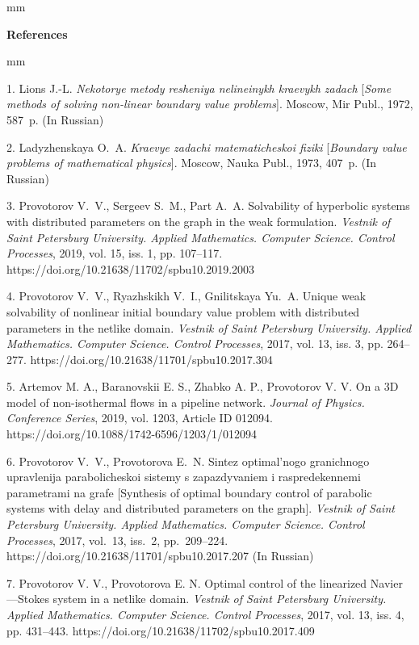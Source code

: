 

{\small



mm

\noindent \textbf{References} }

mm

{\footnotesize



1. Lions J.-L. \textit{Nekotorye metody resheniya nelineinykh
kraevykh zadach} [\textit{Some methods of solving non-linear
boundary value problems}]. Moscow, Mir Publ., 1972, 587~p. (In
Russian)\pagebreak

2. Ladyzhenskaya O.~A. \textit{Kraevye zadachi matematicheskoi
fiziki} [\textit{Boundary value problems of mathematical
physics}]. Moscow, Nauka Publ., 1973, 407~p. (In Russian)

3. Provotorov V.~V., Sergeev S.~M., Part A.~A. Solvability of
hyperbolic systems with distributed parameters on the graph in the
weak formulation. \emph{Vestnik of Saint Petersburg University.
Applied Mathematics. Computer Science. Control Processes}, 2019,
vol. 15, iss. 1, pp. 107--117.
https://doi.org/10.21638/11702/spbu10.2019.2003

4. Provotorov V.~V., Ryazhskikh V.~I., Gnilitskaya Yu.~A.  Unique
weak solvability of nonlinear initial boundary value problem with
distributed parameters in the netlike domain. \emph{Vestnik of
Saint Petersburg University. Applied Mathematics. Computer
Science. Control Processes}, 2017, vol. 13, iss. 3, pp. 264--277.
https://doi.org/10.21638/11701/spbu10.2017.304

5. Artemov M. A.,  Baranovskii E. S., Zhabko A. P., Provotorov V.
V.  On a 3D model of non-isothermal flows in a pipeline network.
\emph{Journal of Physics. Conference Series}, 2019, vol. 1203,
Article ID 012094. https://doi.org/10.1088/1742-6596/1203/1/012094

6. Provotorov V.~V., Provotorova E.~N. Sintez optimal'nogo
granichnogo upravlenija parabolicheskoi sistemy s zapazdyvaniem i
raspredekennemi parametrami na grafe [Synthesis of optimal
boundary control of parabolic systems with delay and distributed
parameters on the graph]. \textit{Vestnik of Saint Petersburg
University. Applied Mathematics. Computer Science. Control
Processes}, 2017, vol.~13, iss.~2, pp.~209--224.
https://doi.org/10.21638/11701/spbu10.2017.207 (In Russian)

7. Provotorov V. V., Provotorova E. N. Optimal control of the
linearized Navier---Stokes system in a netlike domain.
\emph{Vestnik of Saint Petersburg University.  Applied
Mathematics. Computer Science. Control Processes}, 2017, vol. 13,
iss. 4, pp. 431--443.
https://doi.org/10.21638/11702/spbu10.2017.409

}
